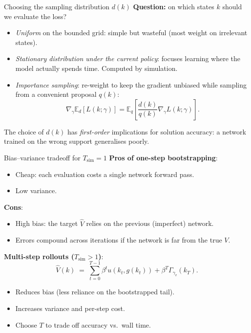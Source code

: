 \begin{frame}{Choosing the sampling distribution $d(k)$}
\textbf{Question:} on which states $k$ should we evaluate the loss?
\medskip
\begin{itemize}
\item \emph{Uniform} on the bounded grid: simple but wasteful (most weight on irrelevant states).
\medskip
\item \emph{Stationary distribution under the current policy}: focuses learning where the model actually spends time. Computed by simulation.
\medskip
\item \emph{Importance sampling}: re-weight to keep the gradient unbiased while sampling from a convenient proposal $q(k)$:
\[
\nabla_{\gamma}\mathbb{E}_{d}[L(k;\gamma)] = \mathbb{E}_q\!\left[\frac{d(k)}{q(k)}\nabla_\gamma L(k;\gamma)\right].
\]
\end{itemize}
\medskip
The choice of $d(k)$ has \emph{first-order} implications for solution accuracy: a network trained on the wrong support generalises poorly.
\end{frame}

\begin{frame}{Bias--variance tradeoff for $T_{\text{sim}}=1$}
\textbf{Pros of one-step bootstrapping}:
\begin{itemize}
\item Cheap: each evaluation costs a single network forward pass.
\item Low variance.
\end{itemize}
\medskip
\textbf{Cons}:
\begin{itemize}
\item High bias: the target $\hat V$ relies on the previous (imperfect) network.
\item Errors compound across iterations if the network is far from the true $V$.
\end{itemize}
\medskip
\textbf{Multi-step rollouts ($T_{\text{sim}}>1$)}:
\[
\hat V(k) \;=\; \sum_{t=0}^{T-1}\beta^t u(k_t, g(k_t)) + \beta^T \Gamma_{\gamma_v}\!(k_T).
\]
\begin{itemize}
\item Reduces bias (less reliance on the bootstrapped tail).
\item Increases variance and per-step cost.
\item Choose $T$ to trade off accuracy vs.\ wall time.
\end{itemize}
\end{frame}

